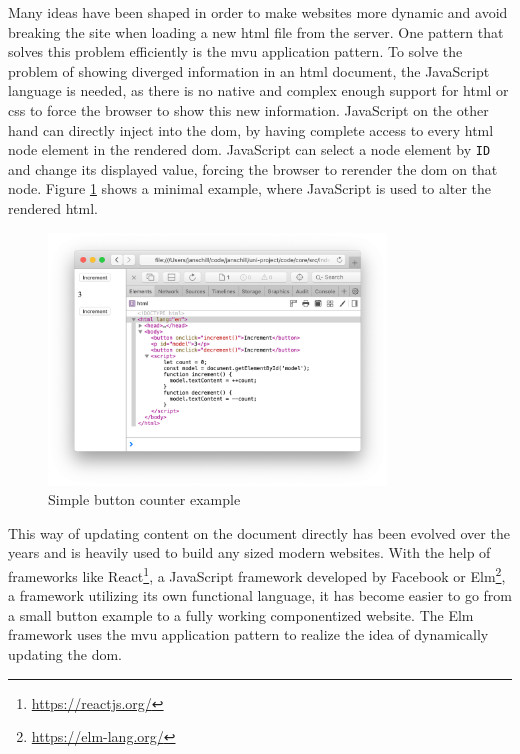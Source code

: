 Many ideas have been shaped in order to make websites more dynamic and avoid breaking the site when loading a new \gls{html} file from the server. One pattern that solves this problem efficiently is the \gls{mvu} application pattern.
To solve the problem of showing diverged information in an \gls{html} document, the JavaScript language is needed, as there is no native and complex enough support for \gls{html} or \gls{css} to force the browser to show this new information. JavaScript on the other hand can directly inject into the \gls{dom}, by having complete access to every \gls{html} node element in the rendered \gls{dom}.
JavaScript can select a node element by \texttt{ID} and change its displayed value, forcing the browser to rerender the \gls{dom} on that node. Figure \ref{fig:button_browser} shows a minimal example, where JavaScript is used to alter the rendered \gls{html}.

\begin{figure}
    \centering
    \includegraphics[width=0.8\textwidth]{images/button-browser.png}
    \caption{Simple button counter example}
    \label{fig:button_browser}
\end{figure}

This way of updating content on the document directly has been evolved over the years and is heavily used to build any sized modern websites. With the help of frameworks like React\footnote{\url{https://reactjs.org/}}, a JavaScript framework developed by Facebook or Elm\footnote{\url{https://elm-lang.org/}}, a framework utilizing its own functional language, it has become easier to go from a small button example to a fully working componentized website.
The Elm framework uses the \gls{mvu} application pattern to realize the idea of dynamically updating the \gls{dom}.

